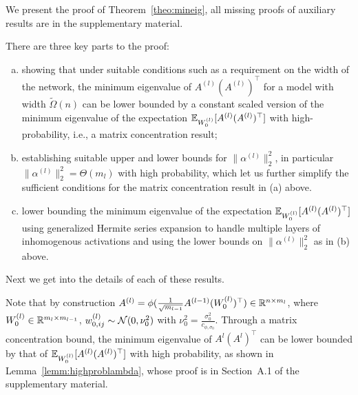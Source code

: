 We present the proof of Theorem~\ref{theo:mineig}, all missing proofs of auxiliary results are in the supplementary material.

 There are three key parts to the proof: 
\begin{enumerate}[(a)]
\item showing that under suitable conditions such as a requirement on the width of the network, the minimum eigenvalue of $A^{(l)} (A^{(l)})^\top$ for a model with width $\tilde{\Omega}(n)$ can be lower bounded by a constant scaled version of the minimum eigenvalue of the expectation $\mathbb{E}_{W_0^{(l)}}[A^{(l)} (A^{(l)})^\top]$ with high-probability, i.e., a matrix concentration result; 
\item establishing suitable upper and lower bounds for $\| \alpha^{(l)}\|_2^2$, in particular $\| \alpha^{(l)}\|_2^2 = \Theta(m_l)$ with high probability, which let us further simplify the sufficient conditions for the matrix concentration result in (a) above.
\item lower bounding the minimum eigenvalue of the expectation $\mathbb{E}_{W_0^{(l)}}[A^{(l)} (A^{(l)})^\top]$ using generalized Hermite series expansion to handle multiple layers of inhomogenous activations and using the lower bounds on $\| \alpha^{(l)}\|_2^2$ as in (b) above. 
\end{enumerate}
Next we get into the details of each of these results.

 Note that by construction $A^{(l)} = \phi( \frac{1}{\sqrt{m_{l-1}}} A^{(l-1)} (W_0^{(l)})^\top) \in \mathbb{R}^{n \times m_l}$, where $W_0^{(l)} \in \mathbb{R}^{m_{l} \times m_{l-1}}$, $w_{0,ij}^{(l)} \sim {\cal N}(0,\nu_0^2)$ with $\nu_0^2 = \frac{\sigma_0^2}{c_{\phi,\sigma_0}}$. Through a matrix concentration bound, the minimum eigenvalue of $A^{l} (A^{l})^\top$ can be lower bounded by that of $\mathbb{E}_{W_0^{(l)}}[A^{(l)} (A^{(l)})^\top]$ with high probability, as shown in Lemma~\ref{lemm:highproblambda}, whose proof is in Section~A.1 of the supplementary material.

